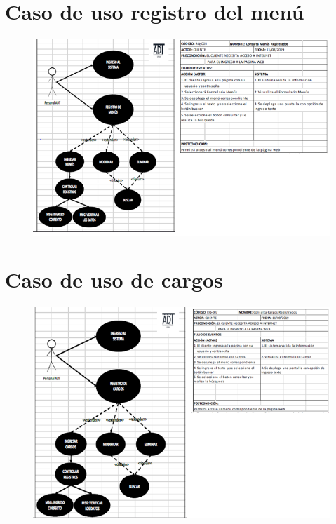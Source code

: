 \documentclass[12pt,a4paper]{article}
\begin{document}
\section*{Caso de uso registro del menú}
\begin{figure}[hbtp]
\caption{}
\centering
\includegraphics[scale=0.5]{OCTAVA.png}
\end{figure}


\section*{Caso de uso de cargos}
\begin{figure}[hbtp]
\caption{}
\centering
\includegraphics[scale=0.5]{NOVENA.png}
\end{figure}
\end{document}
